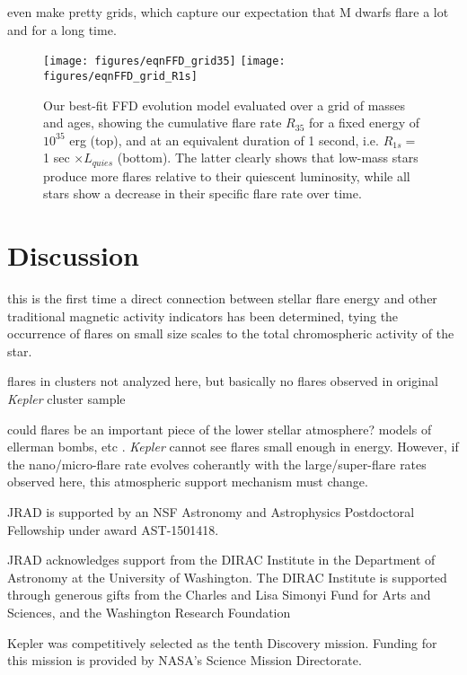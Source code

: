 \documentclass[preprint2]{aastex62}
\newcommand{\Kepler}{\textsl{Kepler}\xspace}
\begin{document}
even make pretty grids, which capture our expectation that M dwarfs flare a lot and for a long time.
\begin{figure}[!t]
\centering
\texttt{[image: figures/eqnFFD\_grid35]}
\texttt{[image: figures/eqnFFD\_grid\_R1s]}
\caption{
Our best-fit FFD evolution model evaluated over a grid of masses and ages, showing the cumulative flare rate $R_{35}$ for a fixed energy of $10^35$ erg (top), and at an equivalent duration of 1 second, i.e. $R_{1s} = $ 1 sec $\times L_{quies}$ (bottom). The latter clearly shows that low-mass stars produce more flares relative to their quiescent luminosity, while all stars show a decrease in their specific flare rate over time.
}
\label{fig:grid}
\end{figure}








\section{Discussion}
\label{sec:discussion}

this is the first time a direct connection between stellar flare energy and other traditional magnetic activity indicators has been determined, tying the occurrence of flares on small size scales to the total chromospheric activity of the star.


flares in clusters not analyzed here, but basically no flares observed in original \Kepler cluster sample

could flares be an important piece of the lower stellar atmosphere? models of ellerman bombs, etc \citep[e.g.][]{hansteen2017}. \Kepler cannot see flares small enough in energy. However, if the nano/micro-flare rate evolves coherantly with the large/super-flare rates observed here, this atmospheric support mechanism must change.





\acknowledgments
JRAD is supported by an NSF Astronomy and Astrophysics Postdoctoral Fellowship under award AST-1501418.

JRAD acknowledges support from the DIRAC Institute in the Department of Astronomy at the University of Washington. The DIRAC Institute is supported through generous gifts from the Charles and Lisa Simonyi Fund for Arts and Sciences, and the Washington Research Foundation


Kepler was competitively selected as the tenth Discovery mission. Funding for this mission is provided by NASA's Science Mission Directorate.




\end{document}
